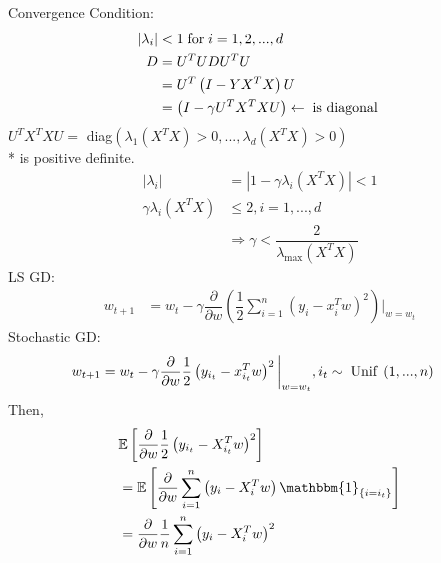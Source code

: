 \documentclass{article}
\begin{document}
Convergence Condition:
\begin{align*}
|\lambda_{i}| &< 1 \text{\;for\;} i = 1, 2, ..., d 
\\ D  &= U^{T} U D U^{T} U 
\\ &= U^{T} \left(I - Y X^{T} X\right) U 
\\ &= \left(I - \gamma U^{T} X^{T} X U \right) \leftarrow \text{\;is diagonal\;}
\end{align*}
$U^{T} X^{T} X U =$ diag$\left(\lambda_{1}\left(X^{T} X\right) > 0, ..., \lambda_{d}\left(X^{T} X\right) > 0\right)$
\\* is positive definite.
\begin{align*}
|\lambda_{i}| &= |1 - \gamma \lambda_{i}\left(X^{T} X\right)| < 1
\\ \gamma \lambda_{i} \left(X^{T} X\right) &\leq  2, i = 1, ..., d 
\\ &\Rightarrow  \gamma < \dfrac{2}{\lambda_{\displaystyle\max} \left(X^{T} X\right)}
\end{align*}
LS GD:
\begin{align*}
w_{t+1} &= w_{t} - \gamma \dfrac{\partial }{\partial w} \left(\dfrac{1}{2} \displaystyle\sum_{i=1}^{n} \left(y_{i} - x_{i}^{T} w\right)^{2} \right) \bigg|_{w = w_{t}}
\end{align*}
Stochastic GD:
\begin{align*}
w_{t+1} &= w_{t} - \gamma \dfrac{\partial }{\partial w} \dfrac{1}{2} \left(y_{i_{t}} - x_{i_{t}}^{T} w\right)^{2} \bigg|_{w = w_{t}}, i_{t} \sim  \text{\;Unif\;} \left(1, ..., n \right)
\end{align*}
Then,
\begin{align*}
&\mathbb{E}\left[\dfrac{\partial }{\partial w} \dfrac{1}{2} \left(y_{i_{t}} - X_{i_{t}}^{T} w\right)^{2} \right]
\\ &= \mathbb{E}\left[\dfrac{\partial }{\partial w} \displaystyle\sum_{i=1}^{n} \left(y_{i} - X_{i}^{T} w\right) \mathbbm{1}_{\left\{i = i_{t}\right\}}\right]
\\ &= \dfrac{\partial }{\partial w} \dfrac{1}{n} \displaystyle\sum_{i=1}^{n} \left(y_{i} - X_{i}^{T} w\right)^{2}
\end{align*}
\end{document}
